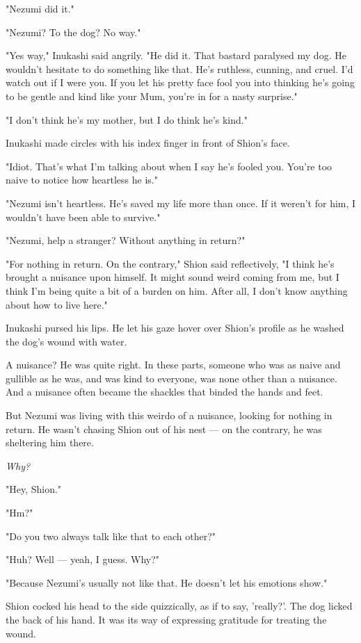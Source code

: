 "Nezumi did it."

"Nezumi? To the dog? No way."

"Yes way," Inukashi said angrily. "He did it. That bastard paralysed my
dog. He wouldn't hesitate to do something like that. He's ruthless,
cunning, and cruel. I'd watch out if I were you. If you let his pretty
face fool you into thinking he's going to be gentle and kind like your
Mum, you're in for a nasty surprise."

"I don't think he's my mother, but I do think he's kind."

Inukashi made circles with his index finger in front of Shion's face.

"Idiot. That's what I'm talking about when I say he's fooled you. You're
too naive to notice how heartless he is."

"Nezumi isn't heartless. He's saved my life more than once. If it
weren't for him, I wouldn't have been able to survive."

"Nezumi, help a stranger? Without anything in return?"

"For nothing in return. On the contrary," Shion said reflectively, "I
think he's brought a nuisance upon himself. It might sound weird coming
from me, but I think I'm being quite a bit of a burden on him. After
all, I don't know anything about how to live here."

Inukashi pursed his lips. He let his gaze hover over Shion's profile as
he washed the dog's wound with water.

A nuisance? He was quite right. In these parts, someone who was as naive
and gullible as he was, and was kind to everyone, was none other than a
nuisance. And a nuisance often became the shackles that binded the hands
and feet.

But Nezumi was living with this weirdo of a nuisance, looking for
nothing in return. He wasn't chasing Shion out of his nest --- on the
contrary, he was sheltering him there.

\emph{Why?}

"Hey, Shion."

"Hm?"

"Do you two always talk like that to each other?"

"Huh? Well --- yeah, I guess. Why?"

"Because Nezumi's usually not like that. He doesn't let his emotions
show."

Shion cocked his head to the side quizzically, as if to say, 'really?'.
The dog licked the back of his hand. It was its way of expressing
gratitude for treating the wound.

